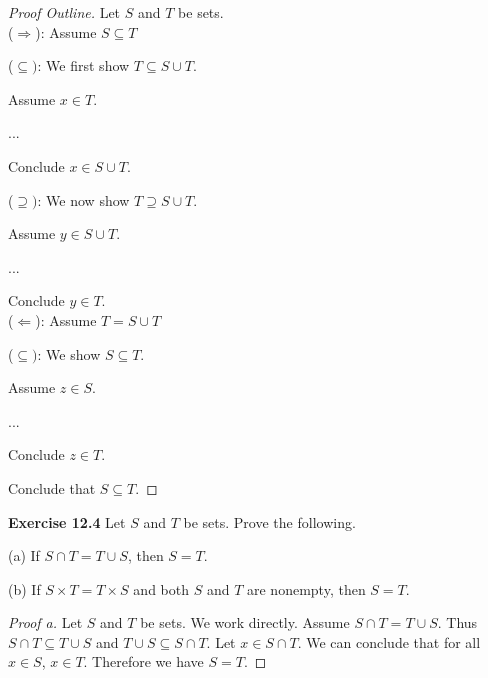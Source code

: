 \documentclass[12pt,oneside]{article}
\newenvironment{exercise}[1]{\vspace{.1in}\noindent\textbf{Exercise #1 \hspace{.05em}}}{}
\begin{document}
\begin{proof}[Proof Outline]
Let $S$ and $T$ be sets. \\
($\Rightarrow$): Assume $S \subseteq T$

($\subseteq)$: We first show $T \subseteq S \cup T$.

\hspace{\parindent} Assume $x \in T$.

\hspace{\parindent} ...

\hspace{\parindent} Conclude $x \in S \cup T$.

($\supseteq)$: We now show $T \supseteq S \cup T$.

\hspace{\parindent} Assume $y \in S \cup T$.

\hspace{\parindent} ...

\hspace{\parindent} Conclude $y \in T$. \\
($\Leftarrow$): Assume $T = S \cup T$

($\subseteq)$: We show $S \subseteq T$.

\hspace{\parindent} Assume $z \in S$.

\hspace{\parindent} ...

\hspace{\parindent} Conclude $z \in T$.

Conclude that $S \subseteq T$.
\end{proof}



\begin{exercise}{12.4}
Let $S$ and $T$ be sets. Prove the following.

(a) If $S \cap T = T \cup S$, then $S = T$.

(b) If $S \times T = T \times S$ and both $S$ and $T$ are nonempty, then $S = T$.
\end{exercise}

\begin{proof}[Proof a]
Let $S$ and $T$ be sets. We work directly. Assume $S \cap T = T \cup S$. Thus $S \cap T \subseteq T \cup S$ and $T \cup S \subseteq S \cap T$. Let $x \in S \cap T$. We can conclude that for all $x \in S$, $x \in T$. Therefore we have $S = T$.
\end{proof}
\end{document}
